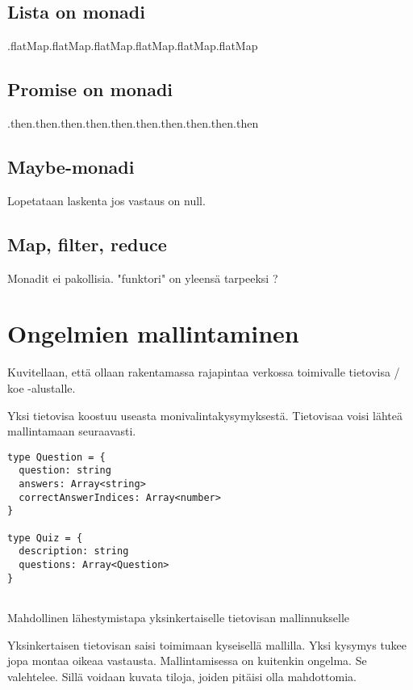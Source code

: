 \subsection{Lista on monadi}
.flatMap.flatMap.flatMap.flatMap.flatMap.flatMap

\subsection{Promise on monadi}

.then.then.then.then.then.then.then.then.then.then
\subsection{Maybe-monadi}

Lopetataan laskenta jos vastaus on null.

\subsection{Map, filter, reduce}

Monadit ei pakollisia. "funktori" on yleensä tarpeeksi ?

\section{Ongelmien mallintaminen}

Kuvitellaan, että ollaan rakentamassa rajapintaa verkossa toimivalle tietovisa / koe -alustalle.

Yksi tietovisa koostuu useasta monivalintakysymyksestä. Tietovisaa voisi lähteä mallintamaan seuraavasti.

\begin{code}
    \begin{verbatim}
type Question = {
  question: string
  answers: Array<string>
  correctAnswerIndices: Array<number>
}

type Quiz = {
  description: string
  questions: Array<Question>
}
         
\end{verbatim}
    \caption{Mahdollinen lähestymistapa yksinkertaiselle tietovisan mallinnukselle}
    \label{code:ts_first_quiz}
\end{code}

Yksinkertaisen tietovisan saisi toimimaan kyseisellä mallilla. Yksi kysymys tukee jopa montaa oikeaa vastausta.
Mallintamisessa on kuitenkin ongelma. Se valehtelee. Sillä voidaan kuvata tiloja, joiden pitäisi olla mahdottomia.

